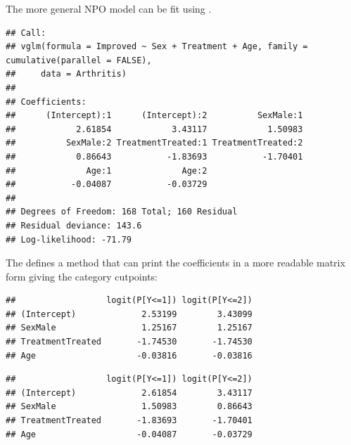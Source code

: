 \documentclass[11pt]{book}
\renewenvironment{knitrout}{\small\renewcommand{\baselinestretch}{.85}}{} %
\begin{document}
The more general NPO model can be fit using .
\begin{knitrout}
\color{fgcolor}\begin{kframe}
\begin{alltt}
 \hlkwb{<-}  \hlopt{~}  \hlopt{+}  \hlopt{+}  
                  \hlstd{=} \hlstd{(}\hlstd{=}\hlstd{))}
\end{alltt}
\begin{verbatim}
## Call:
## vglm(formula = Improved ~ Sex + Treatment + Age, family = cumulative(parallel = FALSE), 
##     data = Arthritis)
## 
## Coefficients:
##      (Intercept):1      (Intercept):2          SexMale:1 
##            2.61854            3.43117            1.50983 
##          SexMale:2 TreatmentTreated:1 TreatmentTreated:2 
##            0.86643           -1.83693           -1.70401 
##              Age:1              Age:2 
##           -0.04087           -0.03729 
## 
## Degrees of Freedom: 168 Total; 160 Residual
## Residual deviance: 143.6 
## Log-likelihood: -71.79
\end{verbatim}
\end{kframe}
\end{knitrout}
The  defines a  method that can print the coefficients
in a more readable matrix form giving the category cutpoints:
\begin{knitrout}
\color{fgcolor}\begin{kframe}
\begin{alltt}
 \hlstd{=}\hlstd{)}
\end{alltt}
\begin{verbatim}
##                  logit(P[Y<=1]) logit(P[Y<=2])
## (Intercept)             2.53199        3.43099
## SexMale                 1.25167        1.25167
## TreatmentTreated       -1.74530       -1.74530
## Age                    -0.03816       -0.03816
\end{verbatim}
\begin{alltt}
 \hlstd{=}\hlstd{)}
\end{alltt}
\begin{verbatim}
##                  logit(P[Y<=1]) logit(P[Y<=2])
## (Intercept)             2.61854        3.43117
## SexMale                 1.50983        0.86643
## TreatmentTreated       -1.83693       -1.70401
## Age                    -0.04087       -0.03729
\end{verbatim}
\end{kframe}
\end{knitrout}
\end{document}
